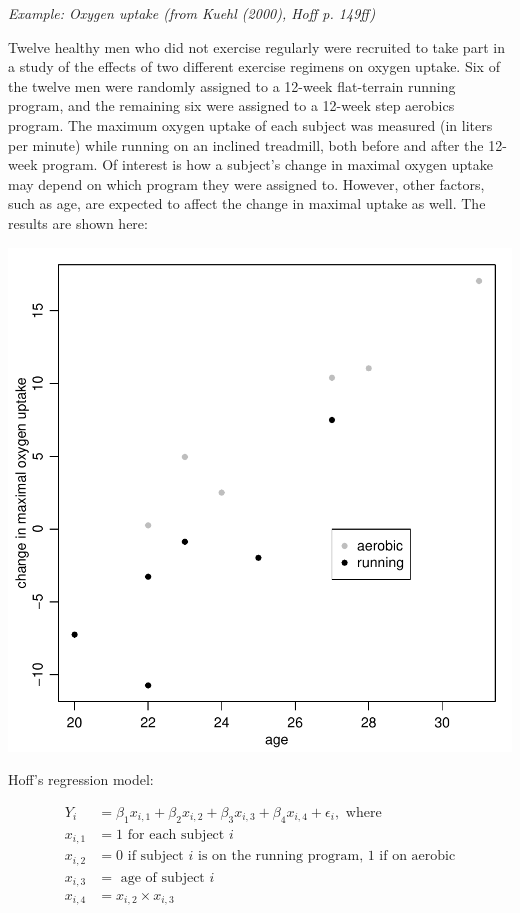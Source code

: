 \documentclass[12pt, a4paper]{article}
\begin{document}
\noindent\textit{Example:  Oxygen uptake (from Kuehl (2000), Hoff p. 149ff)}

\noindent Twelve healthy men who did not exercise regularly were recruited to take part in a study of the effects of two different exercise regimens on oxygen uptake.  Six of the twelve men were randomly assigned to a 12-week flat-terrain running program, and the remaining six were assigned to a 12-week step aerobics program.  The maximum oxygen uptake of each subject was measured (in liters per minute) while running on an inclined treadmill, both before and after the 12-week program.  Of interest is how a subject's change in maximal oxygen uptake may depend on which program they were assigned to.  However, other factors, such as age, are expected to affect the change in maximal uptake as well.  The results are shown here:

\includegraphics{Thesis_v3-011}

\noindent Hoff's regression model:

    \begin{align}
        Y_i &= \beta_1x_{i,1} + \beta_2x_{i,2} + \beta_3x_{i,3} + \beta_4x_{i,4} + \epsilon_i, \text{ where} \label{example_regression_model}\\
        x_{i,1} &= 1 \text{ for each subject } i \nonumber \\
        x_{i,2} &= 0 \text{ if subject } i \text{ is on the running program, } 1 \text{ if on aerobic} \nonumber \\
        x_{i,3} &= \text{ age of subject } i \nonumber \\
        x_{i,4} &= x_{i,2} \times x_{i,3} \nonumber
    \end{align}
\end{document}
